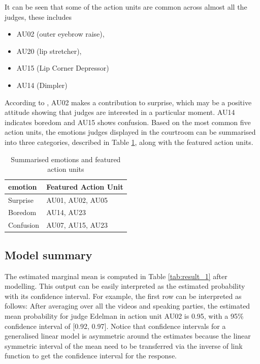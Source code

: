 \documentclass{monashthesis}
\begin{document}
It can be seen that some of the action units are common across almost all the judges, these includes

\begin{itemize}
\tightlist
\item
  AU02 (outer eyebrow raise),
\item
  AU20 (lip stretcher),
\item
  AU15 (Lip Corner Depressor)
\item
  AU14 (Dimpler)
\end{itemize}

According to \textcite{ekman2002facial}, AU02 makes a contribution to surprise, which may be a positive attitude showing that judges are interested in a particular moment. AU14 indicates boredom and AU15 shows confusion. Based on the most common five action units, the emotions judges displayed in the courtroom can be summarised into three categories, described in Table \ref{tab:three_category}, along with the featured action units.

\begin{table}

\caption{\label{tab:unnamed-chunk-6}\label{tab:three_category}Summarised emotions and featured action units}
\centering
\begin{tabular}[t]{l|l}
\hline
emotion & Featured Action Unit\\
\hline
Surprise & AU01, AU02, AU05\\
\hline
Boredom & AU14, AU23\\
\hline
Confusion & AU07, AU15, AU23\\
\hline
\end{tabular}
\end{table}

\hypertarget{model-summary}{%
\subsection{Model summary}\label{model-summary}}

The estimated marginal mean is computed in Table \ref{tab:result_1} after modelling. This output can be easily interpreted as the estimated probability with its confidence interval. For example, the first row can be interpreted as follows: After averaging over all the videos and speaking parties, the estimated mean probability for judge Edelman in action unit AU02 is 0.95, with a 95\% confidence interval of {[}0.92, 0.97{]}. Notice that confidence intervals for a generalised linear model is asymmetric around the estimates because the linear symmetric interval of the mean need to be transferred via the inverse of link function to get the confidence interval for the response.
\end{document}
